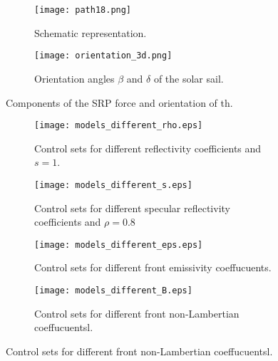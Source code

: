 \documentclass[AMA,STIX1COL]{WileyNJD-v2}
\newcommand{\uvect}[1]{\hat{#1}}
\newcommand{\vect}[1]{#1}
\begin{document}
\begin{figure}
	\centering
	\begin{subfigure}[b]{0.3\textheight}
		\texttt{[image: path18.png]}
		\caption{Schematic representation.}
		\label{fig:forces}
	\end{subfigure}
	\hspace{1cm}
	\begin{subfigure}[b]{0.4\textheight}
		\texttt{[image: orientation\_3d.png]}    
		\caption{Orientation angles $\beta$ and $\delta$ of the solar sail.}
		\label{fig:orientation}
	\end{subfigure}
	\caption{Components of the \ac{SRP} force and orientation of th.}
	\label{fig:srp}
\end{figure}

\begin{figure}[t]
	\centering
	\begin{subfigure}[b]{0.3\textheight}
		\texttt{[image: models\_different\_rho.eps]}
		\caption{Control sets for different reflectivity coefficients and $s = 1$.}
		\label{fig:diff_rho}
	\end{subfigure}
	\hspace{0.5cm}
	\begin{subfigure}[b]{0.3\textheight}
		\texttt{[image: models\_different\_s.eps]}    
		\caption{Control sets for different specular reflectivity coefficients and $\rho = 0.8$}
		\label{fig:diff_s}
	\end{subfigure}
%
\centering
\begin{subfigure}[b]{0.3\textheight}
	\texttt{[image: models\_different\_eps.eps]}
	\caption{Control sets for different front emissivity coeffucuents. }
	\label{fig:diff_eps}
\end{subfigure}
\hspace{0.5cm}
\begin{subfigure}[b]{0.3\textheight}
	\texttt{[image: models\_different\_B.eps]}    
	\caption{Control sets for different front non-Lambertian coeffucuentsl.}
	\label{fig:diff_B}
\end{subfigure}
	\label{fig:diff_optical_prop}
\end{figure}
\end{document}
